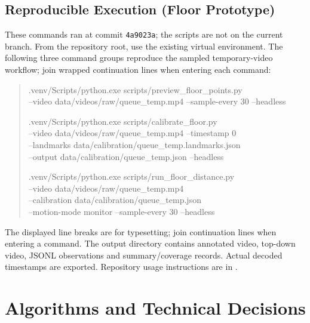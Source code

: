 \subsection{Reproducible Execution (Floor Prototype)}
These commands ran at commit \texttt{4a9023a}; the scripts are not on the current branch. From the repository root, use the existing virtual environment. The following three command groups reproduce the sampled temporary-video workflow; join wrapped continuation lines when entering each command:
\begin{quote}\small\ttfamily
.venv/Scripts/python.exe scripts/preview\_floor\_points.py\\
\hspace*{1em}--video data/videos/raw/queue\_temp.mp4 --sample-every 30 --headless
\par
.venv/Scripts/python.exe scripts/calibrate\_floor.py\\
\hspace*{1em}--video data/videos/raw/queue\_temp.mp4 --timestamp 0\\
\hspace*{1em}--landmarks data/calibration/queue\_temp.landmarks.json\\
\hspace*{1em}--output data/calibration/queue\_temp.json --headless
\par
.venv/Scripts/python.exe scripts/run\_floor\_distance.py\\
\hspace*{1em}--video data/videos/raw/queue\_temp.mp4\\
\hspace*{1em}--calibration data/calibration/queue\_temp.json\\
\hspace*{1em}--motion-mode monitor --sample-every 30 --headless
\end{quote}
The displayed line breaks are for typesetting; join continuation lines when entering a command. The output directory contains annotated video, top-down video, JSONL observations and summary/coverage records. Actual decoded timestamps are exported. Repository usage instructions are in .

\section{Algorithms and Technical Decisions}
